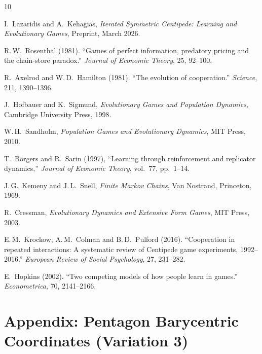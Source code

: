 \documentclass[12pt,a4paper]{article}
\begin{document}
\begin{thebibliography}{10}

  I.~Lazaridis and A.~Kehagias,
  \textit{Iterated Symmetric Centipede: Learning and Evolutionary Games},
  Preprint, March 2026.

  R.\,W.~Rosenthal (1981).
  ``Games of perfect information, predatory pricing and the chain-store paradox.''
  \textit{Journal of Economic Theory}, 25, 92--100.

  R.~Axelrod and W.\,D.~Hamilton (1981).
  ``The evolution of cooperation.''
  \textit{Science}, 211, 1390--1396.

  J.~Hofbauer and K.~Sigmund,
  \textit{Evolutionary Games and Population Dynamics},
  Cambridge University Press, 1998.

  W.\,H.~Sandholm,
  \textit{Population Games and Evolutionary Dynamics},
  MIT Press, 2010.

  T.~B\"{o}rgers and R.~Sarin (1997),
  ``Learning through reinforcement and replicator dynamics,''
  \textit{Journal of Economic Theory}, vol.~77, pp.~1--14.

  J.\,G.~Kemeny and J.\,L.~Snell,
  \textit{Finite Markov Chains},
  Van Nostrand, Princeton, 1969.

  R.~Cressman,
  \textit{Evolutionary Dynamics and Extensive Form Games},
  MIT Press, 2003.

  E.\,M.~Krockow, A.\,M.~Colman and B.\,D.~Pulford (2016).
  ``Cooperation in repeated interactions: A systematic review of Centipede
  game experiments, 1992--2016.''
  \textit{European Review of Social Psychology}, 27, 231--282.

  E.~Hopkins (2002).
  ``Two competing models of how people learn in games.''
  \textit{Econometrica}, 70, 2141--2166.

\end{thebibliography}

\appendix

\section{Appendix: Pentagon Barycentric Coordinates (Variation 3)}
\end{document}
